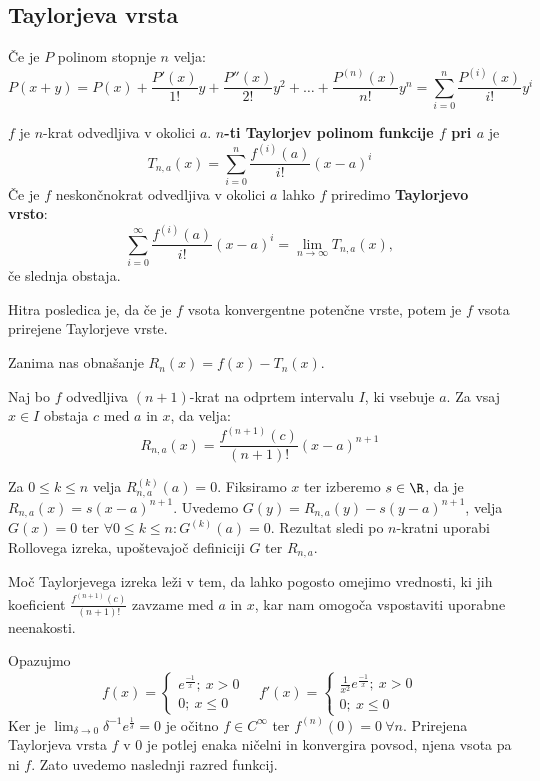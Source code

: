 \documentclass[12pt, a4paper, unicode]{article}
\begin{document}
\subsection{Taylorjeva vrsta}
\begin{lema}
Če je $P$ polinom stopnje $n$ velja:
\[
P(x+y) = P(x) + \frac{P'(x)}{1!}y + \frac{P''(x)}{2!}y^2 + \dots + \frac{P^{\left(n \right)}(x)}{n!}y^n = \sum_{i=0}^{n} \frac{P^{\left( i \right)}(x)}{i!}y^i
\]
\end{lema}
\begin{definicija}
$f$ je $n$-krat odvedljiva v okolici $a$. \textbf{$n$-ti Taylorjev polinom funkcije $f$ pri $a$} je
\[
T_{n,a}(x) = \sum_{i=0}^n \frac{f^{\left( i \right)}(a)}{i!}(x-a)^i
\]
Če je $f$ neskončnokrat odvedljiva v okolici $a$ lahko $f$ priredimo \textbf{Taylorjevo vrsto}:
\[
\sum_{i=0}^\infty \frac{f^{\left( i \right)}(a)}{i!}(x-a)^i = \lim_{n \to \infty} T_{n,a}(x),
\]
če slednja obstaja.
\end{definicija}
Hitra posledica je, da če je $f$ vsota konvergentne potenčne vrste, potem je $f$ vsota prirejene Taylorjeve vrste.

Zanima nas obnašanje $R_n(x) = f(x) - T_n(x)$.
\begin{izrek}
Naj bo $f$ odvedljiva $(n+1)$-krat na odprtem intervalu $I$, ki vsebuje $a$. Za vsaj $x \in I$ obstaja $c$ med $a$ in $x$, da velja:
\[
R_{n,a}(x) = \frac{f^{\left( n+1 \right)}(c)}{(n+1)!}(x-a)^{n+1}
\]
\end{izrek}
\begin{oris}
Za $0 \leq k \leq n$ velja $R_{n,a}^{(k)}(a) = 0$. Fiksiramo $x$ ter izberemo $s \in \R$, da je $R_{n,a}(x) = s(x-a)^{n+1}$. Uvedemo $G(y) = R_{n,a}(y) - s(y-a)^{n+1}$, velja $G(x) = 0$ ter $\forall 0 \leq k \leq n: G^{(k)}(a) = 0$. Rezultat sledi po $n$-kratni uporabi Rollovega izreka, upoštevajoč definiciji $G$ ter $R_{n,a}$.
\end{oris}
Moč Taylorjevega izreka leži v tem, da lahko pogosto omejimo vrednosti, ki jih koeficient $\frac{f^{\left( n+1 \right)}(c)}{(n+1)!}$ zavzame med $a$ in $x$, kar nam omogoča vspostaviti uporabne neenakosti.
\begin{naloga}
Opazujmo
$$
f(x)=
\begin{cases}
e^{\frac{-1}{x}}; \: x > 0\\
0; \: x \leq 0
\end{cases}
\quad f'(x)=
\begin{cases}
\frac{1}{x^2}e^{\frac{-1}{x}}; \: x > 0\\
0; \: x \leq 0
\end{cases}
$$
Ker je $\lim_{\delta \to 0} \delta^{-1} e^{\frac{1}{\delta}} = 0 $ je očitno $f \in C^{\infty}$ ter $f^{(n)}(0)= 0 \: \forall n$. Prirejena Taylorjeva vrsta $f$ v $0$ je potlej enaka ničelni in konvergira povsod, njena vsota pa ni $f$. Zato uvedemo naslednji razred funkcij.
\end{naloga}
\end{document}
